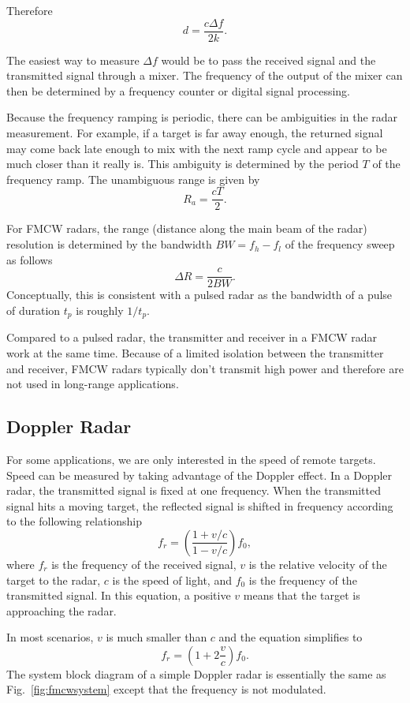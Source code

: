 \documentclass[letterpaper, 11pt]{article}
\begin{document}
Therefore
\[
d = \frac{c\Delta f}{2k}.
\]

The easiest way to measure $\Delta f$ would be to pass the received signal and the transmitted signal through a mixer. The frequency of the output of the mixer can then be determined by a frequency counter or digital signal processing. 

Because the frequency ramping is periodic, there can be ambiguities in the radar measurement. For example, if a target is far away enough, the returned signal may come back late enough to mix with the next ramp cycle and appear to be much closer than it really is. This ambiguity is determined by the period $T$ of the frequency ramp. The unambiguous range is given by 
\[
R_a = \frac{cT}{2}. 
\]

For FMCW radars, the range (distance along the main beam of the radar) resolution is determined by the bandwidth $BW = f_h - f_l$ of the frequency sweep as follows
\[
\Delta R = \frac{c}{2BW}. 
\]
Conceptually, this is consistent with a pulsed radar as the bandwidth of a pulse of duration $t_p$ is roughly $1/t_p$. 

Compared to a pulsed radar, the transmitter and receiver in a FMCW radar work at the same time. Because of a limited isolation between the transmitter and receiver, FMCW radars typically don't transmit high power and therefore are not used in long-range applications.

\subsection{Doppler Radar}

For some applications, we are only interested in the speed of remote targets. Speed can be measured by taking advantage of the Doppler effect. In a Doppler radar, the transmitted signal is fixed at one frequency. When the transmitted signal hits a moving target, the reflected signal is shifted in frequency according to the following relationship 
\[
f_r = \left( \frac{\displaystyle 1+v/c}{\displaystyle 1-v/c}  \right) f_0,
\] 
where $f_r$ is the frequency of the received signal, $v$ is the relative velocity of the target to the radar, $c$ is the speed of light, and $f_0$ is the frequency of the transmitted signal. In this equation, a positive $v$ means that the target is approaching the radar. 

In most scenarios, $v$ is much smaller than $c$ and the equation simplifies to 
\[
f_r = \left( 1+2\frac{v}{c}  \right) f_0. 
\]
The system block diagram of a simple Doppler radar is essentially the same as Fig.~\ref{fig:fmcwsystem} except that the frequency is not modulated. 
\end{document}
